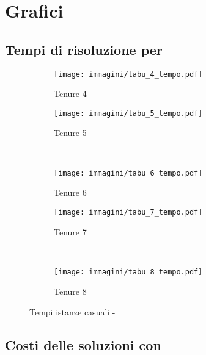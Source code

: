 \clearpage
\section{Grafici}
\label{sec:grafici}

\subsection{Tempi di risoluzione per \tabu}

\begin{figure}[htb]
	\centering
	\begin{subfigure}[b]{.45\textwidth}
		\texttt{[image: immagini/tabu\_4\_tempo.pdf]}
		\caption{Tenure 4}
	\end{subfigure}
	\quad
	\begin{subfigure}[b]{.45\textwidth}
		\texttt{[image: immagini/tabu\_5\_tempo.pdf]}
		\caption{Tenure 5}
	\end{subfigure}
	\\
	\begin{subfigure}[b]{.45\textwidth}
		\texttt{[image: immagini/tabu\_6\_tempo.pdf]}
		\caption{Tenure 6}
	\end{subfigure}
	\quad
	\begin{subfigure}[b]{.45\textwidth}
		\texttt{[image: immagini/tabu\_7\_tempo.pdf]}
		\caption{Tenure 7}
	\end{subfigure}
	\\
	\begin{subfigure}[b]{.45\textwidth}
		\texttt{[image: immagini/tabu\_8\_tempo.pdf]}
		\caption{Tenure 8}
	\end{subfigure}
	\caption{Tempi istanze casuali - \tabu}
	\label{fig:tempi tabu}
\end{figure}

\clearpage
\subsection{Costi delle soluzioni con \tabu}

